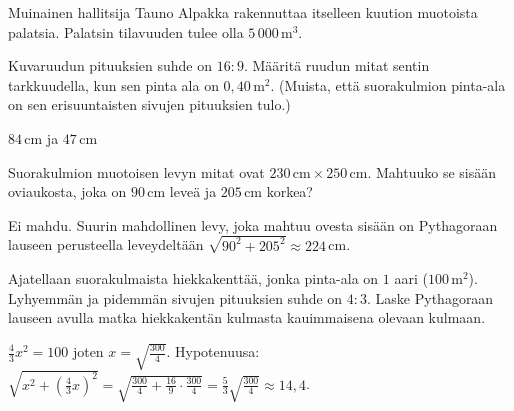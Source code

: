 \begin{tehtavasivu}
\begin{tehtava}
Muinainen hallitsija Tauno Alpakka rakennuttaa itselleen kuution muotoista palatsia.  Palatsin tilavuuden tulee olla $5\,000\,\mathrm{m}^3$. 
\begin{vastaus}
\end{vastaus}
\end{tehtava}

\begin{tehtava}
Kuvaruudun pituuksien suhde on $16:9$. Määritä ruudun mitat sentin tarkkuudella, kun sen pinta ala on \(0,40\,\mathrm{m}^2\). (Muista, että suorakulmion pinta-ala on sen erisuuntaisten sivujen pituuksien tulo.)
\begin{vastaus}
$84\,$cm ja $47$\,cm
\end{vastaus}
\end{tehtava}

\begin{tehtava}
Suorakulmion muotoisen levyn mitat ovat $230\,\text{cm}\times 250\,\text{cm}$. Mahtuuko se sisään oviaukosta, joka on $90$\,cm leveä ja $205$\,cm korkea?
        \begin{vastaus}
        Ei mahdu. Suurin mahdollinen levy, joka mahtuu ovesta sisään on Pythagoraan lauseen perusteella leveydeltään $\sqrt{90^2+205^2}\approx 224$\,cm.
        \end{vastaus}
\end{tehtava}

\begin{tehtava}
Ajatellaan suorakulmaista hiekkakenttää, jonka pinta-ala on $1$ aari ($100\,\mathrm{m}^2$). Lyhyemmän ja pidemmän sivujen pituuksien suhde on $4:3$. Laske Pythagoraan lauseen avulla matka hiekkakentän kulmasta kauimmaisena olevaan kulmaan.
\begin{vastaus}
$\frac{4}{3}x^2=100$ joten $x = \sqrt{\frac{300}{4}}$. 
Hypotenuusa: $\sqrt{x^2 + (\frac{4}{3}x)^2}=\sqrt{\frac{300}{4}+\frac{16}{9}\cdot \frac{300}{4}}
=\frac{5}{3}\sqrt{\frac{300}{4}}\approx 14{,}4$.
\end{vastaus}
\end{tehtava}



\end{tehtavasivu}
